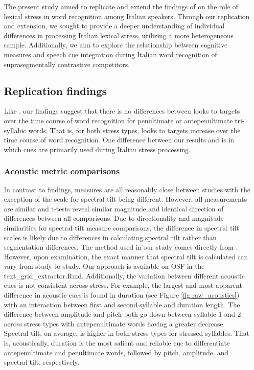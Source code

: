
The present study aimed to replicate and extend the findings of \cite{Sulpizio_McQueen_2012} on the role of lexical stress in word recognition among Italian speakers. Through our replication and extension, we sought to provide a deeper understanding of individual differences in processing Italian lexical stress, utilizing a more heterogeneous sample. Additionally, we aim to explore the relationship between cognitive measures and speech cue integration during Italian word recognition of suprasegmentally contrastive competitors.

\subsection{Replication findings}
Like \cite{Sulpizio_McQueen_2012}, our findings suggest that there is no differences between looks to targets over the time course of word recognition for penultimate or antepenultimate tri-syllabic words. That is, for both stress types, looks to targets increase over the time course of word recognition. One difference between our results and \cite{Sulpizio_McQueen_2012} is in which cues are primarily used during Italian stress processing.

\subsubsection{Acoustic metric comparisons}
In contrast to \cite{Corretta2023} findings, measures are all reasonably close between studies with the exception of the scale for spectral tilt being different. However, all measurements are similar and t-tests reveal similar magnitude and identical direction of differences between all comparisons. Due to directionality and magnitude similarities for spectral tilt measure comparisons, the difference in spectral tilt scales is likely due to differences in calculating spectral tilt rather than segmentation differences. The method used in our study comes directly from \citep{sluijter1996spectral,cutler2007dutch}. However, upon examination, the exact manner that spectral tilt is calculated can vary from study to study. Our approach is available on OSF in the text\_grid\_extractor.Rmd. Additionally, the variation between different acoustic cues is not consistent across stress. For example, the largest and most apparent difference in acoustic cues is found in duration (see Figure \ref{fig:raw_acoustics}) with an interaction between first and second syllable and duration length. The difference between amplitude and pitch both go down between syllable 1 and 2 across stress types with antepenultimate words having a greater decrease. Spectral tilt, on average, is higher in both stress types for stressed syllables. That is, acoustically, duration is the most salient and reliable cue to differentiate antepenultimate and penultimate words, followed by pitch, amplitude, and spectral tilt, respectively.



